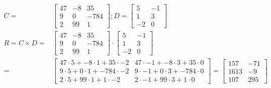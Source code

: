 \begin{align*}
    C  =
    &\begin{bmatrix}
        47 & -8 & 35\\
        9 & 0 & -784 \\
        2 & 99 & 1
    \end{bmatrix}
    ; D =
    \begin{bmatrix}
        5  & -1\\
        1  & 3 \\
        -2 & 0
    \end{bmatrix}\\
    R  = C\times D =
    &\begin{bmatrix}
        47 & -8 & 35\\
        9 & 0 & -784 \\
        2 & 99 & 1
    \end{bmatrix}\cdot
    \begin{bmatrix}
        5  & -1\\
        1  & 3 \\
        -2 & 0
    \end{bmatrix}\\
    =
    &\begin{bmatrix}
        47\cdot5 + -8\cdot1 + 35\cdot-2 & 47\cdot-1 + -8\cdot3 + 35\cdot0 \\
        9\cdot5 + 0\cdot1 + -784\cdot-2 & 9\cdot-1 + 0\cdot3 + -784\cdot0 \\
        2\cdot5 + 99\cdot1 + 1\cdot-2 & 2\cdot-1 + 99\cdot3 + 1\cdot0
    \end{bmatrix}
    =
    \begin{bmatrix}
        157  & -71\\
        1613  & -9 \\
        107 & 295
    \end{bmatrix}
\end{align*}

